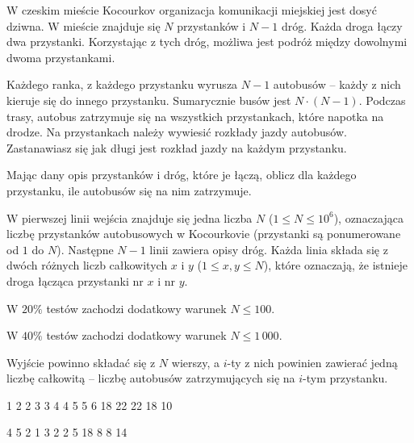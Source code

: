 

\usepackage[utf8]{inputenc}
\usepackage[T1]{fontenc}
\usepackage[polish]{babel}
\usepackage{polski}





W czeskim mieście Kocourkov organizacja komunikacji miejskiej jest dosyć dziwna.
W mieście znajduje się $N$ przystanków i $N-1$ dróg.
Każda droga łączy dwa przystanki.
Korzystając z tych dróg, możliwa jest podróż między dowolnymi dwoma przystankami.

Każdego ranka, z każdego przystanku wyrusza $N-1$ autobusów -- każdy z nich kieruje się do innego przystanku.
Sumarycznie busów jest $N \cdot (N - 1)$.
Podczas trasy, autobus zatrzymuje się na wszystkich przystankach, które napotka na drodze.
Na przystankach należy wywiesić rozkłady jazdy autobusów.
Zastanawiasz się jak długi jest rozkład jazdy na każdym przystanku.


Mając dany opis przystanków i dróg, które je łączą,
	oblicz dla każdego przystanku, ile autobusów się na nim zatrzymuje.


W pierwszej linii wejścia znajduje się jedna liczba $N$ ($1 \le N \le 10^6$),
	oznaczająca liczbę przystanków autobusowych w Kocourkovie
	(przystanki są ponumerowane od $1$ do $N$).
Następne $N-1$ linii zawiera opisy dróg.
Każda linia składa się z dwóch różnych liczb całkowitych $x$ i $y$ ($1 \le x, y \le N$),
	które oznaczają, że istnieje droga łącząca przystanki nr $x$ i nr $y$.

W $20\%$ testów zachodzi dodatkowy warunek $N \le 100$.

W $40\%$ testów zachodzi dodatkowy warunek $N \le 1\,000$.


Wyjście powinno składać się z $N$ wierszy, a $i$-ty z nich powinien zawierać jedną liczbę całkowitą
	-- liczbę autobusów zatrzymujących się na $i$-tym przystanku.



1 2
2 3
3 4
4 5
5 6
18
22
22
18
10
\sampleEND

4 5
2 1
3 2
2 5
18
8
8
14
\sampleEND



